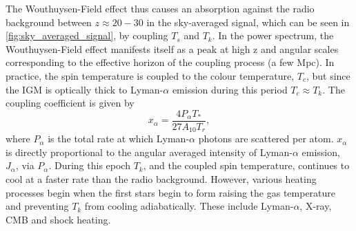 The Wouthuysen-Field effect thus causes an absorption against the radio background between $z\approx20-30$ in the sky-averaged signal, which can be seen in \cref{fig:sky_averaged_signal}, by coupling $T_s$ and $T_k$. In the power spectrum, the Wouthuysen-Field effect manifests itself as a peak at high z and angular scales corresponding to the effective horizon of the coupling process (a few Mpc). In practice, the spin temperature is coupled to the colour temperature, $T_{c}$, but since the IGM is optically thick to Lyman-$\alpha$ emission during this period $T_c \approx T_k$. The coupling coefficient is given by
\begin{equation}
    x_\alpha = \frac{4 P_\alpha T_*}{27 A_{10} T_r},
\end{equation}
where $P_\alpha$ is the total rate at which Lyman-$\alpha$ photons are scattered per atom. $x_\alpha$ is directly proportional to the angular averaged intensity of Lyman-$\alpha$ emission, $J_\alpha$, via $P_\alpha$. During this epoch $T_k$, and the coupled spin temperature, continues to cool at a faster rate than the radio background. However, various heating processes begin when the first stars begin to form raising the gas temperature and preventing $T_k$ from cooling adiabatically. These include Lyman-$\alpha$, X-ray, CMB and shock heating.

